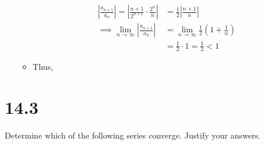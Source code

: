 \documentclass[10pt,a4paper]{article}
\theoremstyle{definition}
\begin{document}
\begin{enumerate}[label = (\alph*)]
\begin{itemize}
	\begin{align*}
	\left|\frac{a_{n+1}}{a_n}\right| = \left|\frac{n + 1}{2^{n+1}} \cdot \frac{2^n}{n}\right| &= \frac{1}{2}\left|\frac{n + 1}{n}\right|\\
	\implies \lim_{n \to \infty} \left|\frac{a_{n+1}}{a_n}\right| &= \lim_{n \to \infty} \frac{1}{2}\left(1 + \frac{1}{n}\right)\\
	&= \frac{1}{2} \cdot 1 = \frac{1}{2} < 1
	\end{align*}
	\item Thus, 
	\end{itemize}
\end{enumerate}

\section*{14.3}
Determine which of the following series converge. Justify your answers.
\end{document}
